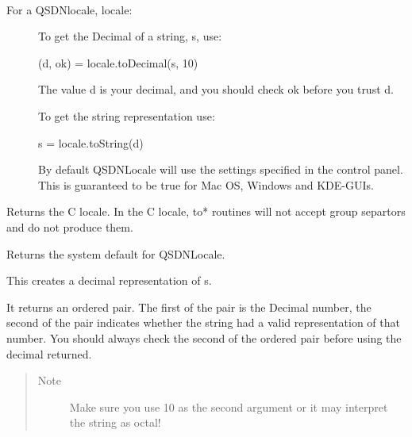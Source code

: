 \documentclass[letterpaper,10pt,english]{sphinxmanual}
\begin{document}
\begin{fulllineitems}
\label{index:qsdn.QSDNLocale}~\begin{description}
\item[{For a QSDNlocale, locale:  }] \leavevmode
To get the Decimal of a string, s, use:

(d, ok) = locale.toDecimal(s, 10)

The value d is your decimal, and you should check ok before you trust d.

To get the string representation use:

s = locale.toString(d)

By default QSDNLocale will use the settings specified in the control panel.  This is guaranteed to be true for Mac OS, Windows and KDE-GUIs.

\end{description}

\begin{fulllineitems}
\label{index:qsdn.QSDNLocale.c}
Returns the C locale.  In the C locale, to* routines will not accept group separtors and do not produce them.

\end{fulllineitems}


\begin{fulllineitems}
\label{index:qsdn.QSDNLocale.system}
Returns the system default for QSDNLocale.

\end{fulllineitems}


\begin{fulllineitems}
\label{index:qsdn.QSDNLocale.toDecimal}
This creates a decimal representation of s.

It returns an ordered pair.  The first of the pair is the Decimal number, the second of the pair indicates whether the string had a valid representation of that number.  You should always check the second of the ordered pair before using the decimal returned.
\begin{quote}\begin{description}
\item[{Note }] \leavevmode
Make sure you use 10 as the second argument or it may interpret the string as octal!


\end{description}
\end{quote}
\end{fulllineitems}
\end{fulllineitems}
\end{document}
